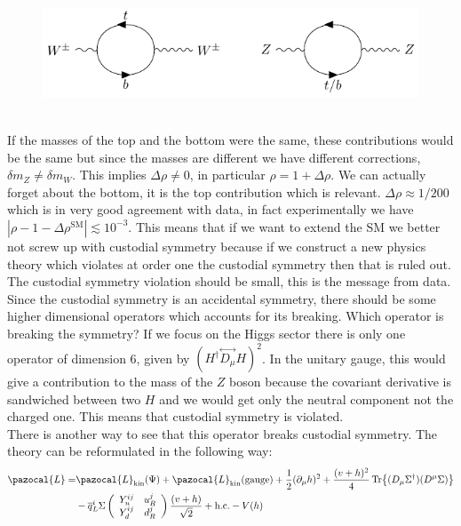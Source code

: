 \documentclass[../main.tex]{subfiles}
\begin{document}
\begin{figure}[h]
    \centering
    \includegraphics{Images/wztb.pdf}
    \caption*{}
\end{figure}\\
If the masses of the top and the bottom were the same, these contributions would be the same but since the masses are different we have different corrections, $\delta m_Z\neq\delta m_W$. This implies $\Delta\rho\neq0$, in particular $\rho=1+\Delta\rho$. We can actually forget about the bottom, it is the top contribution which is relevant. $\Delta\rho\approx1/200$ which is in very good agreement with data, in fact experimentally we have $|\rho-1-\Delta\rho^{\text{SM}}|\lesssim10^{-3}$. This means that if we want to extend the SM we better not screw up with custodial symmetry because if we construct a new physics theory which violates at order one the custodial symmetry then that is ruled out. The custodial symmetry violation should be small, this is the message from data.\\
Since the custodial symmetry is an accidental symmetry, there should be some higher dimensional operators which accounts for its breaking. Which operator is breaking the symmetry? If we focus on the Higgs sector there is only one operator of dimension 6, given by $(H^\dagger\overset{\leftrightarrow}{D_\mu}H)^2$. In the unitary gauge, this would give a contribution to the mass of the $Z$ boson because the covariant derivative is sandwiched between two $H$ and we would get only the neutral component not the charged one. This means that custodial symmetry is violated.\\
There is another way to see that this operator breaks custodial symmetry. The theory can be reformulated in the following way:
\begin{align*}
\pazocal{L}=&\pazocal{L}_{\text{kin}}(\Psi)+\pazocal{L}_{\text{kin}}(\text{gauge})+\frac{1}{2}(\partial_\mu h)^2+\frac{(v+h)^2}{4}\Tr{(D_\mu\Sigma^\dagger)(D^\mu\Sigma)}\\
&-\overline{q}_L^i\Sigma\left(\begin{array}{cc}
    Y_u^{ij} & u_R^j \\
    Y_d^{ij} & d_R^j
\end{array}\right)\frac{(v+h)}{\sqrt{2}}+\text{h.c.}-V(h)
\end{align*}
\end{document}
